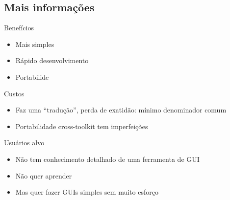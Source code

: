 

\subsection{Mais informações}

\begin{frame}
  \begin{multicols}{2}
    
    \begin{block}{Benefícios}
      \begin{itemize}
      \item Mais simples
      \item Rápido desenvolvimento
      \item Portabilide
      \end{itemize}
    \end{block}
    \vfill \columnbreak
    \begin{block}{Custos}
      \begin{itemize}
      \item Faz uma ``tradução'', perda de exatidão: mínimo denominador
        comum
      \item Portabilidade cross-toolkit tem imperfeições
      \end{itemize}
    \end{block}
  \end{multicols}

  \begin{block}{Usuários alvo}
    \begin{itemize}
    \item Não tem conhecimento detalhado de uma ferramenta de GUI
    \item Não quer aprender
    \item Mas quer fazer GUIs simples sem muito esforço
    \end{itemize}
  \end{block}

\end{frame}

